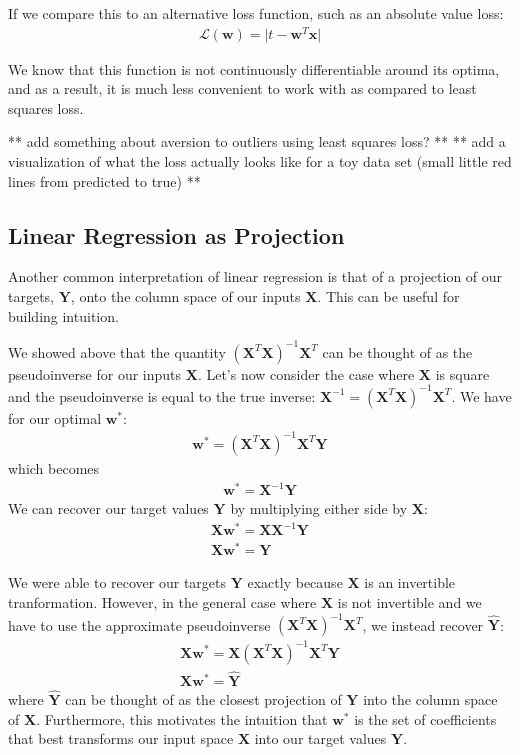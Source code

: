 If we compare this to an alternative loss function, such as an absolute value loss:
\begin{align}
    \mathcal{L}(\textbf{w}) = \lvert t - \textbf{w}^{T}\textbf{x} \rvert
\end{align}

We know that this function is not continuously differentiable around its optima, and as a result, it is much less convenient to work with as compared to least squares loss.

** add something about aversion to outliers using least squares loss? **
** add a visualization of what the loss actually looks like for a toy data set (small little red lines from predicted to true) **

\subsection{Linear Regression as Projection}
Another common interpretation of linear regression is that of a projection of our targets, $\textbf{Y}$, onto the column space of our inputs $\textbf{X}$. This can be useful for building intuition.

We showed above that the quantity $(\textbf{X}^{T}\textbf{X})^{-1}\textbf{X}^{T}$ can be thought of as the pseudoinverse for our inputs $\textbf{X}$. Let's now consider the case where $\textbf{X}$ is square and the pseudoinverse is equal to the true inverse: $\textbf{X}^{-1} = (\textbf{X}^{T}\textbf{X})^{-1}\textbf{X}^{T}$. We have for our optimal $\textbf{w}^{*}$:
\begin{align*}
    \textbf{w}^{*} = (\textbf{X}^{T}\textbf{X})^{-1}\textbf{X}^{T}\textbf{Y}
\end{align*}
which becomes
\begin{align*}
    \textbf{w}^{*} = \textbf{X}^{-1}\textbf{Y}
\end{align*}
We can recover our target values $\textbf{Y}$ by multiplying either side by $\textbf{X}$:
\begin{align*}
    \textbf{X}\textbf{w}^{*} = \textbf{X}\textbf{X}^{-1}\textbf{Y} \\
    \textbf{X}\textbf{w}^{*} = \textbf{Y}
\end{align*}

We were able to recover our targets $\textbf{Y}$ exactly because $\textbf{X}$ is an invertible tranformation. However, in the general case where $\textbf{X}$ is not invertible and we have to use the approximate pseudoinverse $(\textbf{X}^{T}\textbf{X})^{-1}\textbf{X}^{T}$, we instead recover $\hat{\textbf{Y}}$:
\begin{align*}
    \textbf{X}\textbf{w}^{*} = \textbf{X}(\textbf{X}^{T}\textbf{X})^{-1}\textbf{X}^{T}\textbf{Y} \\
    \textbf{X}\textbf{w}^{*} = \hat{\textbf{Y}}
\end{align*}
where $\hat{\textbf{Y}}$ can be thought of as the closest projection of $\textbf{Y}$ into the column space of $\textbf{X}$. Furthermore, this motivates the intuition that $\textbf{w}^{*}$ is the set of coefficients that best transforms our input space $\textbf{X}$ into our target values $\textbf{Y}$.

